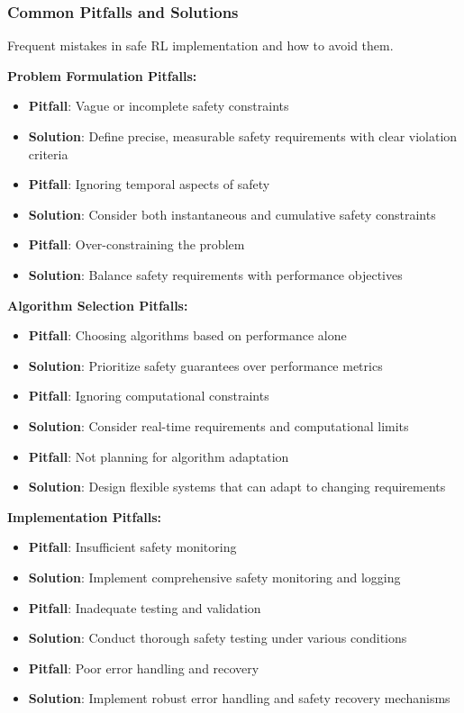 \documentclass[12pt]{article}
\begin{document}
{{{{\subsubsection{Common Pitfalls and Solutions}

Frequent mistakes in safe RL implementation and how to avoid them.

\textbf{Problem Formulation Pitfalls:}
\begin{itemize}
\item \textbf{Pitfall}: Vague or incomplete safety constraints
\item \textbf{Solution}: Define precise, measurable safety requirements with clear violation criteria
\item \textbf{Pitfall}: Ignoring temporal aspects of safety
\item \textbf{Solution}: Consider both instantaneous and cumulative safety constraints
\item \textbf{Pitfall}: Over-constraining the problem
\item \textbf{Solution}: Balance safety requirements with performance objectives
\end{itemize}

\textbf{Algorithm Selection Pitfalls:}
\begin{itemize}
\item \textbf{Pitfall}: Choosing algorithms based on performance alone
\item \textbf{Solution}: Prioritize safety guarantees over performance metrics
\item \textbf{Pitfall}: Ignoring computational constraints
\item \textbf{Solution}: Consider real-time requirements and computational limits
\item \textbf{Pitfall}: Not planning for algorithm adaptation
\item \textbf{Solution}: Design flexible systems that can adapt to changing requirements
\end{itemize}

\textbf{Implementation Pitfalls:}
\begin{itemize}
\item \textbf{Pitfall}: Insufficient safety monitoring
\item \textbf{Solution}: Implement comprehensive safety monitoring and logging
\item \textbf{Pitfall}: Inadequate testing and validation
\item \textbf{Solution}: Conduct thorough safety testing under various conditions
\item \textbf{Pitfall}: Poor error handling and recovery
\item \textbf{Solution}: Implement robust error handling and safety recovery mechanisms
\end{itemize}

}}}}
\end{document}
